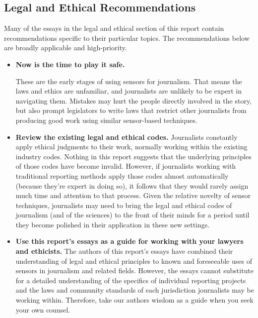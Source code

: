 \begin{itemize}
\begin{itemized}
\section{Legal and Ethical Recommendations}
Many of the essays in the legal and ethical section of this report contain
recommendations specific to their particular topics. The recommendations
below are broadly applicable and high-priority.

\begin{itemize}
\item \textbf{Now is the time to play it safe.}

These are the early stages of using sensors for journalism. That means the
laws and ethics are unfamiliar, and journalists are unlikely to be expert in
navigating them. Mistakes may hurt the people directly involved in the
story, but also prompt legislators to write laws that restrict other journalists
from producing good work using similar sensor-based techniques.

\item \textbf{Review the existing legal and ethical codes.}
Journalists constantly apply ethical judgments to their work, normally working
within the existing industry codes. Nothing in this report suggests that
the underlying principles of those codes have become invalid. However, if
journalists working with traditional reporting methods apply those codes
almost automatically (because they're expert in doing so), it follows that
they would rarely assign much time and attention to that process. Given
the relative novelty of sensor techniques, journalists may need to bring the
legal and ethical codes of journalism (and of the sciences) to the front of
their minds for a period until they become polished in their application in
these new settings.

\item \textbf{Use this report's essays as a guide for working with your lawyers and ethicists.}
The authors of this report's essays have combined their understanding of
legal and ethical principles to known and foreseeable uses of sensors in
journalism and related fields. However, the essays cannot substitute for a
detailed understanding of the specifics of individual reporting projects and
the laws and community standards of each jurisdiction journalists may be
working within. Therefore, take our authors wisdom as a guide when you
seek your own counsel.



\end{itemize}
\end{itemized}
\end{itemize}
